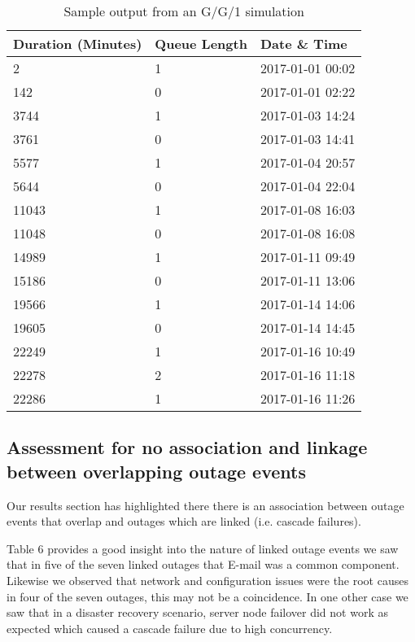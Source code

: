 \documentclass[5p]{elsarticle}
\begin{document}
\begin {table}
\caption {Sample output from an G/G/1 simulation} 
\begin{center}
\begin{tabular}{p{1.8cm} |  p{1.25cm} | p{3.2cm}} \hline \bf{Duration (Minutes)} & \bf{Queue Length}  & \bf{Date \& Time}
\\ \hline 2  & 1 & 2017-01-01 00:02
\\ 142 & 0 & 2017-01-01 02:22
\\ 3744 & 1 & 2017-01-03 14:24 
\\ 3761 & 0 & 2017-01-03 14:41
\\ 5577 & 1 & 2017-01-04 20:57
\\ 5644 & 0 & 2017-01-04 22:04
\\ 11043 & 1 & 2017-01-08 16:03
\\ 11048 & 0 & 2017-01-08 16:08
\\ 14989 & 1 & 2017-01-11 09:49 
\\ 15186 & 0 & 2017-01-11 13:06 
\\ 19566 & 1 & 2017-01-14 14:06
\\ 19605 & 0 & 2017-01-14 14:45
\\ 22249 & 1 &  2017-01-16 10:49
\\ 22278 & 2 & 2017-01-16 11:18
\\ 22286 & 1 & 2017-01-16 11:26
\\ \hline
\end{tabular}
\end{center}
\end{table}


\subsection{Assessment for no association and linkage between overlapping outage events}

Our results section has highlighted there there is an association between outage events that overlap and outages which are linked (i.e. cascade failures).

Table 6 provides a good insight into the nature of linked outage events we saw that in five of the seven linked outages that E-mail was a common component. Likewise we observed that network and configuration issues were the root causes in four of the seven outages, this may not be a coincidence. In one other case we saw that in a disaster recovery scenario, server node failover did not work as expected which caused a cascade failure due to high concurrency.
\end{document}
